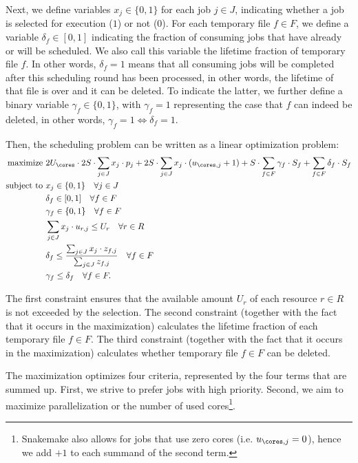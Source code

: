 \documentclass[parskip=half]{scrartcl}
\begin{document}
Next, we define variables $x_j \in \{0,1\}$ for each job $j \in J$, indicating whether a job is selected for execution ($1$) or not ($0$).
For each temporary file $f \in F$, we define a variable $\delta_f \in [0,1]$ indicating the fraction of consuming jobs that have already or will be scheduled.
We also call this variable the lifetime fraction of temporary file $f$.
In other words, $\delta_f = 1$ means that all consuming jobs will be completed after this scheduling round has been processed, in other words, the lifetime of that file is over and it can be deleted.
To indicate the latter, we further define a binary variable $\gamma_f \in \{0,1\}$, with $\gamma_f = 1$ representing the case that $f$ can indeed be deleted, in other words, $\gamma_f = 1 \Leftrightarrow \delta_f = 1$.

Then, the scheduling problem can be written as a linear optimization problem:
\begin{align*}
	\text{maximize } & 2U_\cores \cdot 2S \cdot \sum_{j \in J} x_j \cdot p_j + 2S \cdot \sum_{j \in J} x_j \cdot (u_{\cores,j} + 1) + S \cdot \sum_{f \in F} \gamma_f \cdot S_f + \sum_{f \in F} \delta_f \cdot S_f \\ \text{subject to } & x_j \in \{0,1\} \quad \forall j \in J\\ \quad & \delta_f \in [0,1] \quad  \forall f \in F\\ \quad & \gamma_f \in \{0,1\} \quad \forall f \in F\\ \quad & \sum_{j \in J} x_j \cdot u_{r,j} \leq U_r \quad \forall r \in R\\ \quad & \delta_f \leq \frac{\sum_{j \in J} x_j \cdot z_{f,j}}{\sum_{j \in J} z_{f,j}} \quad\forall f \in F\\ \quad & \gamma_f \leq \delta_f \quad\forall f \in F.
\end{align*}

The first constraint ensures that the available amount $U_r$ of each resource $r \in R$ is not exceeded by the selection.
The second constraint (together with the fact that it occurs in the maximization) calculates the lifetime fraction of each temporary file $f \in F$.
The third constraint (together with the fact that it occurs in the maximization) calculates whether temporary file $f \in F$ can be deleted.

The maximization optimizes four criteria, represented by the four terms that are summed up.
First, we strive to prefer jobs with high priority.
Second, we aim to maximize parallelization or the number of used cores\footnote{Snakemake also allows for jobs that use zero cores (i.e. $u_{\cores,j} = 0$), hence we add $+1$ to each summand of the second term.}.
\end{document}

